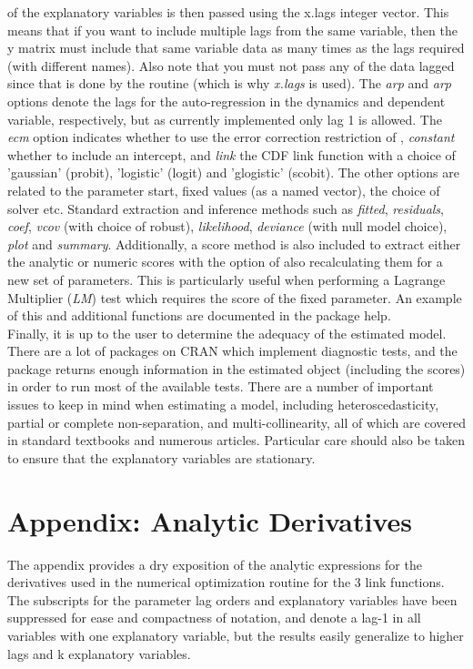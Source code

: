 of the explanatory variables is then passed using the x.lags integer vector. This means that if you want to include multiple lags from the same
variable, then the y matrix must include that same variable data as many times as the lags required (with different names). Also note that you must
not pass any of the data lagged since that is done by the routine (which is why \emph{x.lags} is used). The \emph{arp} and \emph{arp} options denote
the lags for the auto-regression in the dynamics and dependent variable, respectively, but as currently implemented only lag 1 is allowed. The \emph{ecm}
option indicates whether to use the error correction restriction of \cite{Nyberg2011}, \emph{constant} whether to include an intercept, and \emph{link}
the CDF link function with a choice of 'gaussian' (probit), 'logistic' (logit) and 'glogistic' (scobit). The other options are related to
the parameter start, fixed values (as a named vector), the choice of solver etc. Standard extraction and inference methods such as \emph{fitted}, \emph{residuals},
\emph{coef}, \emph{vcov} (with choice of robust), \emph{likelihood}, \emph{deviance} (with null model choice), \emph{plot} and \emph{summary}. Additionally,
a score method is also included to extract either the analytic or numeric scores with the option of also recalculating them for a new set of parameters.
This is particularly useful when performing a Lagrange Multiplier (\emph{LM}) test which requires the score of the fixed parameter. An example of this and
additional functions are documented in the package help.\\
Finally, it is up to the user to determine the adequacy of the estimated model. There are a lot of packages on CRAN which implement diagnostic tests, and
the \verb@dbm@ package returns enough information in the estimated object (including the scores) in order to run most of the available tests. There are a
number of important issues to keep in mind when estimating a model, including heteroscedasticity, partial or complete non-separation, and
multi-collinearity, all of which are covered in standard textbooks and numerous articles. Particular care should also be taken to ensure that
the explanatory variables are stationary.
\section{Appendix: Analytic Derivatives}\label{sec:Appendix}
The appendix provides a dry exposition of the analytic expressions for the derivatives used in the numerical
optimization routine for the 3 link functions. The subscripts for the parameter lag orders and explanatory
variables have been suppressed for ease and compactness of notation, and denote a lag-1 in all variables with
one explanatory variable, but the results easily generalize to higher lags and k explanatory variables.

